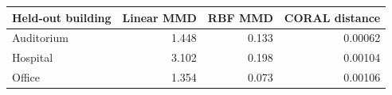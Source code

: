 \begin{tabular}{lrrr}
\toprule
Held-out building & Linear MMD & RBF MMD & CORAL distance \\
\midrule
Auditorium & 1.448 & 0.133 & 0.00062 \\
Hospital & 3.102 & 0.198 & 0.00104 \\
Office & 1.354 & 0.073 & 0.00106 \\
\bottomrule
\end{tabular}